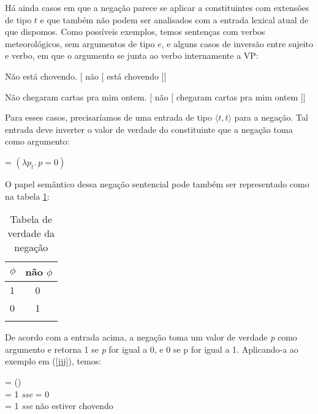 Há ainda casos em que a negação parece se aplicar a constituintes com extensões de tipo $t$ e que também não podem ser analisados com a entrada lexical atual de que dispomos. Como possíveis exemplos, temos sentenças com verbos meteorológicos, sem argumentos de tipo $e$, e alguns casos de inversão entre sujeito e verbo, em que o argumento se junta ao verbo internamente a VP:

\begin{exe}
\ex\label{jjj}
\begin{xlist}
\ex Não está chovendo.\label{jjja}
\ex $[$ não [ está chovendo ]]\label{jjjb}
\end{xlist}
\end{exe}

\begin{exe}
\ex\label{grn}
\begin{xlist}
\ex Não chegaram cartas pra mim ontem.\label{grna}
\ex $[$ não [ chegaram cartas pra mim ontem ]]\label{grnb}
\end{xlist}
\end{exe}


\n Para esses casos, precisaríamos de uma entrada de tipo $\langle t,t\rangle$ para a negação. Tal entrada deve inverter o valor de verdade do constituinte que a negação toma como argumento:

\begin{exe}
	\ex {} = $(\lambda p_{t}.\ p=0)$
\end{exe}

\n O papel semântico dessa negação sentencial pode também ser representado como na tabela \ref{tabelaneg}:

\begin{table}
	\begin{tabularx}{.3\textwidth}{XX}
		\lsptoprule
		$\phi$ & não $\phi$ \\
		\midrule 
		1 & \ \ 0 \\  
		0 & \ \ 1 \\
		\lspbottomrule
	\end{tabularx}
	\caption{Tabela de verdade da negação}
	\label{tabelaneg}
\end{table}


\n De acordo com a entrada acima, a negação toma um valor de verdade \textit{p} como argumento e retorna 1 se \textit{p} for igual a 0, e 0 se p for igual a 1. Aplicando-a ao exemplo em (\ref{jjj}), temos:

\begin{exe}
	\ex {} = ()\\
	 = 1 \textit{sse}  = 0\\
	 = 1 \textit{sse} não estiver chovendo
\end{exe}

